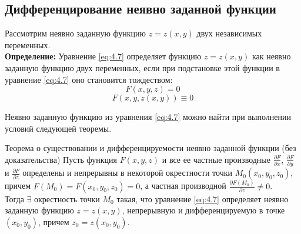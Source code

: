 \subsection{Дифференцирование неявно заданной функции} \label{part:2.8}

Рассмотрим неявно заданную функцию $z = z(x,y)$ двух независимых переменных.\\

\textbf{Определение:} Уравнение \cref{eq:4.7} определяет функцию $z = z(x,y)$ как неявно заданную функцию двух переменных, если при подстановке этой функции в уравнение \cref{eq:4.7} оно становится тождеством:
\begin{equation} \label{eq:4.7}
	F(x,y,z) = 0
\end{equation}
\begin{equation} \label{eq:4.8}
	F(x,y,z(x,y)) \equiv 0
\end{equation}

Неявно заданную функцию из уравнения \cref{eq:4.7} можно найти при выполнении условий следующей теоремы.

\begin{tbox}{Теорема о существовании и дифференцируемости неявно заданной функции (без доказательства)}
	Пусть функция $F(x,y,z)$ и все ее частные производные $\frac{\partial F}{\partial x}$, $\frac{\partial F}{\partial y}$ и $\frac{\partial F}{\partial z}$ определены и непрерывны в некоторой окрестности точки $M_0(x_0,y_0, z_0)$, причем $F(M_0) = F(x_0, y_0, z_0) = 0$, а частная производной $\frac{\partial F(M_0)}{\partial z} \neq 0$.\\

	Тогда $\exists$ окрестность точки $M_0$ такая, что уравнение \cref{eq:4.7} определяет неявно заданную функцию $z = z(x,y)$, непрерывную и дифференцируемую в точке $(x_0, y_0)$, причем $z_0 = z(x_0, y_0)$.
\end{tbox}


